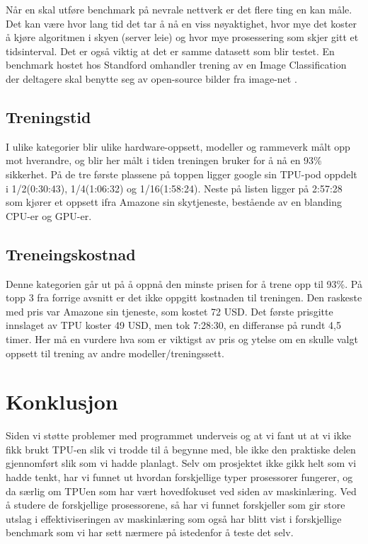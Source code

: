 Når en skal utføre benchmark på nevrale nettverk er det flere ting en kan måle. Det kan være hvor lang tid det tar å nå en viss nøyaktighet, hvor mye det koster å kjøre algoritmen i skyen (server leie) og hvor mye prosessering som skjer gitt et tidsinterval. Det er også viktig at det er samme datasett som blir testet. En benchmark hostet hos Standford\cite{benchmark} omhandler trening av en Image Classification der deltagere skal benytte seg av open-source bilder fra image-net \cite{image-net}.

\subsection{Treningstid}
I ulike kategorier blir ulike hardware-oppsett, modeller og rammeverk målt opp mot hverandre, og blir her målt i tiden treningen bruker for å nå en 93\% sikkerhet. På de tre første plassene på toppen ligger google sin TPU-pod oppdelt i 1/2(0:30:43), 1/4(1:06:32) og 1/16(1:58:24). Neste på listen ligger på 2:57:28 som kjører et oppsett ifra Amazone sin skytjeneste, bestående av en blanding CPU-er og GPU-er. 

\subsection{Treneingskostnad}
Denne kategorien går ut på å oppnå den minste prisen for å trene opp til 93\%. På topp 3 fra forrige avsnitt er det ikke oppgitt kostnaden til treningen. Den raskeste med pris var Amazone sin tjeneste, som kostet 72 USD. Det første prisgitte innslaget av TPU koster 49 USD, men tok 7:28:30, en differanse på rundt 4,5 timer. Her må en vurdere hva som er viktigst av pris og ytelse om en skulle valgt oppsett til trening av andre modeller/treningssett.

\newpage
\section{Konklusjon}
Siden vi støtte problemer med programmet underveis og at vi fant ut at vi ikke fikk brukt TPU-en slik vi trodde til å begynne med, ble ikke den praktiske delen gjennomført slik som vi hadde planlagt.
Selv om prosjektet ikke gikk helt som vi hadde tenkt, har vi funnet ut hvordan forskjellige typer prosessorer fungerer, og da særlig om TPUen som har vært hovedfokuset ved siden av maskinlæring. Ved å studere de forskjellige prosessorene, så har vi funnet forskjeller som gir store utslag i effektiviseringen av maskinlæring som også har blitt vist i forskjellige benchmark som vi har sett nærmere på istedenfor å teste det selv.

